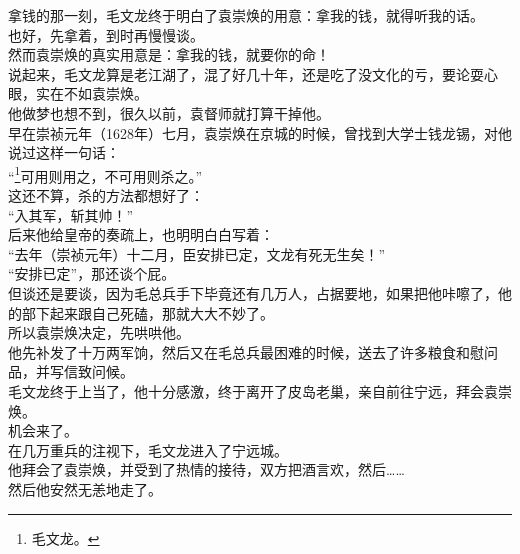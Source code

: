 \begin{multicols}{\theparacolNo}
拿钱的那一刻，毛文龙终于明白了袁崇焕的用意：拿我的钱，就得听我的话。\\

也好，先拿着，到时再慢慢谈。\\

然而袁崇焕的真实用意是：拿我的钱，就要你的命！\\

说起来，毛文龙算是老江湖了，混了好几十年，还是吃了没文化的亏，要论耍心眼，实在不如袁崇焕。\\

他做梦也想不到，很久以前，袁督师就打算干掉他。\\

早在崇祯元年（1628年）七月，袁崇焕在京城的时候，曾找到大学士钱龙锡，对他说过这样一句话：\\

“\footnote{毛文龙。}可用则用之，不可用则杀之。”\\

这还不算，杀的方法都想好了：\\

“入其军，斩其帅！”\\

后来他给皇帝的奏疏上，也明明白白写着：\\

“去年（崇祯元年）十二月，臣安排已定，文龙有死无生矣！”\\

“安排已定”，那还谈个屁。\\

但谈还是要谈，因为毛总兵手下毕竟还有几万人，占据要地，如果把他咔嚓了，他的部下起来跟自己死磕，那就大大不妙了。\\

所以袁崇焕决定，先哄哄他。\\

他先补发了十万两军饷，然后又在毛总兵最困难的时候，送去了许多粮食和慰问品，并写信致问候。\\

毛文龙终于上当了，他十分感激，终于离开了皮岛老巢，亲自前往宁远，拜会袁崇焕。\\

机会来了。\\

在几万重兵的注视下，毛文龙进入了宁远城。\\

他拜会了袁崇焕，并受到了热情的接待，双方把酒言欢，然后……\\

然后他安然无恙地走了。\\


\end{multicols}
